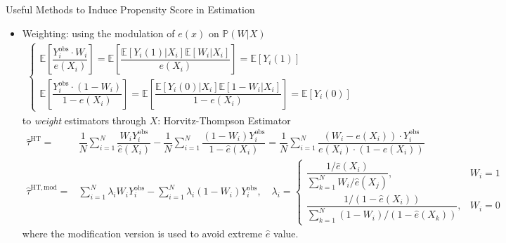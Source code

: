 \begin{point}
    Useful Methods to Induce Propensity Score in Estimation
\end{point}
\begin{itemize}[topsep=2pt,itemsep=0pt]
    \item Weighting: using the modulation of $ e(x) $ on $ \mathbb{P}\left( W|X \right)  $
    \begin{align}\label{EqaPropensityScoreWeighting}
        \begin{cases}
            \mathbb{E}\left[ \dfrac{Y_i^\mathrm{obs}\cdot W_i }{e(X_i)} \right]=\mathbb{E}\left[ \dfrac{\mathbb{E}\left[ Y_i(1)|X_i \right]\mathbb{E}\left[ W_i|X_i \right]  }{e(X_i)} \right]=\mathbb{E}\left[ Y_i(1) \right]\\
            \mathbb{E}\left[ \dfrac{Y_i^\mathrm{obs}\cdot (1-W_i) }{1-e(X_i)} \right]=\mathbb{E}\left[ \dfrac{\mathbb{E}\left[ Y_i(0)|X_i \right]\mathbb{E}\left[ 1-W_i|X_i \right]  }{1-e(X_i)} \right]=\mathbb{E}\left[ Y_i(0) \right]
        \end{cases} 
    \end{align}
    to \textit{weight} estimators through $ X $: Horvitz-Thompson Estimator 
    \begin{align}
        \hat{\tau}^\mathrm{HT} = & \dfrac{1}{N}\sum_{i=1}^N\dfrac{W_iY^\mathrm{obs}_i }{\hat{e}(X_i)}-\dfrac{1}{N}\sum_{i=1}^N\dfrac{(1-W_i)Y^\mathrm{obs}_i }{1-\hat{e}(X_i)}=\dfrac{1}{N}\sum_{i=1}^N\dfrac{(W_i-e(X_i))\cdot Y^\mathrm{obs}_i }{e(X_i)\cdot (1-e(X_i))} \\
        \hat{\tau}^\mathrm{HT,mod} = & \sum_{i=1}^N \lambda _iW_iY^\mathrm{obs}_i-\sum_{i=1}^N\lambda _i(1-W_i)Y^\mathrm{obs}_i ,\quad \lambda _i=\begin{cases}
            \dfrac{1/\hat{e}(X_i)}{\sum_{k=1}^NW_i /\hat{e}(X_j)},&W_i=1\\
            \dfrac{1/(1-\hat{e}(X_i))}{\sum_{k=1}^N  (1-W_i)/(1-\hat{e}(X_k))},&W_i=0
        \end{cases}  
    \end{align}
    where the modification version is used to avoid extreme $ \hat{e} $ value.


\end{itemize}
